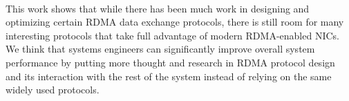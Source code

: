\paragraph{} This work shows that while there has been much work in designing and optimizing certain RDMA data
exchange protocols, there is still room for many interesting protocols that take full advantage of modern RDMA-enabled NICs.
We think that systems engineers can significantly improve overall system performance by putting more thought and research in
RDMA protocol design and its interaction with the rest of the system instead of relying on the same widely used protocols.
